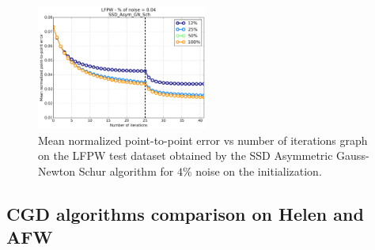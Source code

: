 \begin{figure}[h!]
    \centering
    \includegraphics[width=0.50\textwidth]{experiments/noise_vs_sampling/ssd_asymmetric_gn/mean_error_vs_iters_ssd_asymmetric_gn_4.png}
    \caption{Mean normalized point-to-point error vs number of iterations graph on the LFPW test dataset obtained by the SSD Asymmetric Gauss-Newton Schur algorithm for $4$\% noise on the initialization.}
    \label{fig:mean_error_vs_iters_ssd_asymmetric_gn_4}
\end{figure}

\subsection{CGD algorithms comparison on Helen and AFW}






